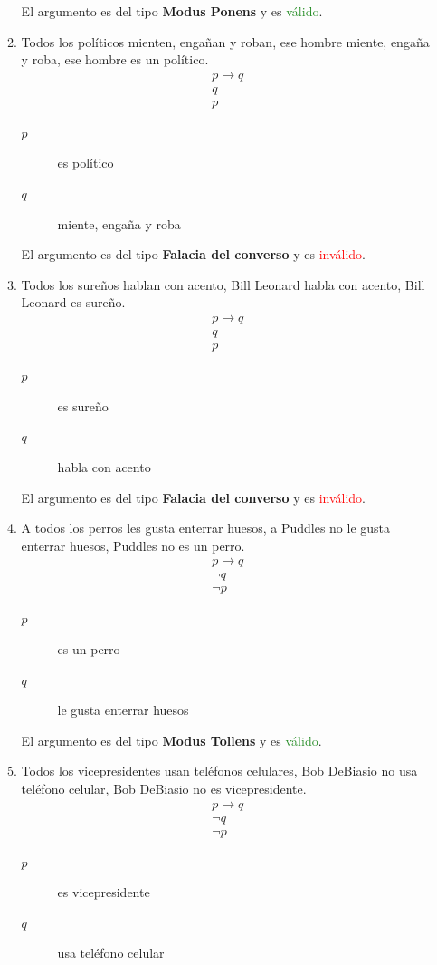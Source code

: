 \documentclass[12pt,letterpaper]{exam}
\begin{document}
\begin{enumerate}
\begin{enumerate}[label=\alph*)]
El argumento es del tipo \textbf{Modus Ponens} y es \textcolor{ForestGreen}{válido}.

\item Todos los políticos mienten, engañan y roban, ese hombre miente, engaña y roba, ese hombre es un político.
\[
\begin{array}{c}
p \to q \\
q \\
\hline
p
\end{array}
\]
\begin{description}
  \item[$p$] es político
  \item[$q$] miente, engaña y roba
\end{description}

El argumento es del tipo \textbf{Falacia del converso} y es \textcolor{red}{inválido}.

\item Todos los sureños hablan con acento, Bill Leonard habla con acento, Bill Leonard es sureño.
\[
\begin{array}{c}
p \to q \\
q \\
\hline
p
\end{array}
\]
\begin{description}
  \item[$p$] es sureño
  \item[$q$] habla con acento
\end{description}

El argumento es del tipo \textbf{Falacia del converso} y es \textcolor{red}{inválido}.

\item A todos los perros les gusta enterrar huesos, a Puddles no le gusta enterrar huesos, Puddles no es un perro.
\[
\begin{array}{c}
p \to q \\
\neg q \\
\hline
\neg p
\end{array}
\]
\begin{description}
  \item[$p$] es un perro
  \item[$q$] le gusta enterrar huesos
\end{description}

El argumento es del tipo \textbf{Modus Tollens} y es \textcolor{ForestGreen}{válido}.

\item Todos los vicepresidentes usan teléfonos celulares, Bob DeBiasio no usa teléfono celular, Bob DeBiasio no es vicepresidente.
\[
\begin{array}{c}
p \to q \\
\neg q \\
\hline
\neg p
\end{array}
\]
\begin{description}
  \item[$p$] es vicepresidente
  \item[$q$] usa teléfono celular
\end{description}


\end{enumerate}
\end{enumerate}
\end{document}
